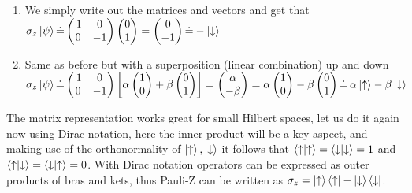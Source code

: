 \begin{enumerate}[label = \textbf{\alph*)}]
\item We simply write out the matrices and vectors and get that \\$\sigma_z\ket{\psi} \dot{=} \begin{pmatrix}
\,1 & 0 \\
0 & -1 \\
\end{pmatrix}\begin{pmatrix}
0 \\ 1
\end{pmatrix} = \begin{pmatrix}
0 \\ -1
\end{pmatrix} \dot{=} -\ket{\downarrow}$ 

\item Same as before but with a superposition (linear combination) up and down 
\\$\sigma_z\ket{\psi} \dot{=} \begin{pmatrix}
\,1 & 0 \\
0 & -1 \\
\end{pmatrix}\left[\alpha\begin{pmatrix}
1 \\ 0
\end{pmatrix} + \beta\begin{pmatrix}
0 \\ 1
\end{pmatrix} \right]= \begin{pmatrix}
\alpha \\ -\beta
\end{pmatrix}  = \alpha\begin{pmatrix}
1 \\ 0
\end{pmatrix} -\beta\begin{pmatrix}
0 \\ 1
\end{pmatrix} \dot{=}\, \alpha\ket{\uparrow} - \beta\ket{\downarrow}$ \end{enumerate}
The matrix representation works great for small Hilbert spaces, let us do it again now using Dirac notation, here the inner product will be a key aspect, and making use of the orthonormality of $\ket{\uparrow},\ket{\downarrow}$ it follows that $\bra{\uparrow}\ket{\uparrow} = \bra{\downarrow}\ket{\downarrow} = 1$ and $\bra{\uparrow}\ket{\downarrow} = \bra{\downarrow}\ket{\uparrow} = 0$.
With Dirac notation operators can be expressed as outer products of bras and kets, thus Pauli-Z can be written as $\sigma_z = \ket{\uparrow}\bra{\uparrow} - \ket{\downarrow}\bra{\downarrow}$.

